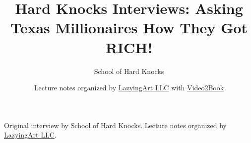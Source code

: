 \documentclass[11pt,oneside]{book}
\begin{document}
\frontmatter
\title{Hard Knocks Interviews: Asking Texas Millionaires How They Got RICH!}
\author{School of Hard Knocks}
\date{Lecture notes organized by \href{https://lazying.art}{LazyingArt LLC} with \href{https://github.com/lachlanchen/Video2Book}{Video2Book}}
\maketitle
\begin{center}
\small Original interview by School of Hard Knocks. Lecture notes organized by \href{https://lazying.art}{LazyingArt LLC}.
\end{center}
\clearpage
\mainmatter

\end{document}

